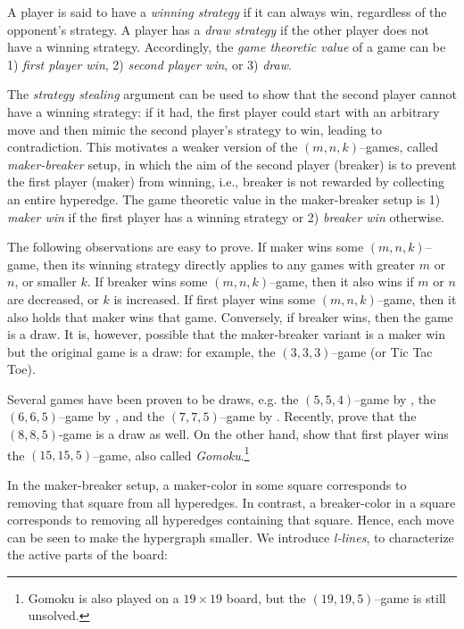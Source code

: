 \documentclass[conference]{IEEEtran}
\theoremstyle{definition}
\begin{document}
A player is said to have a \emph{winning strategy} if it can always win, regardless of the opponent's strategy. A player has a \emph{draw strategy} if the other player does not have a winning strategy. Accordingly, the \emph{game theoretic value} of a game can be 1) \emph{first player win}, 2) \emph{second player win}, or 3) \emph{draw}.

The \emph{strategy stealing} argument can be used to show that the second player cannot have a winning strategy: if it had, the first player could start with an arbitrary move and then mimic the second player's strategy to win, leading to contradiction. This motivates a weaker version of the $(m, n, k)$--games,
called \emph{maker-breaker} setup, in which the aim of the second player (breaker) is to prevent the first player (maker) from winning, i.e., breaker is not rewarded by collecting an entire hyperedge. The game theoretic value in the maker-breaker setup is 1) \emph{maker win} if the first player has a winning strategy or 2) \emph{breaker win} otherwise.

The following observations are easy to prove. If maker wins some $(m,n,k)$--game, then its winning strategy directly applies to any games with greater $m$ or $n$, or smaller $k$. If breaker wins some $(m,n,k)$--game, then it also wins if $m$ or $n$ are decreased, or $k$ is increased. 
If first player wins some $(m,n,k)$--game, then it also holds that maker wins that game. Conversely, if breaker wins, then the game is a draw. It is, however, possible that the maker-breaker variant is a maker win but the original game is a draw: for example, the $(3,3,3)$--game (or Tic Tac Toe).

Several games have been proven to be draws, e.g. the $(5,5,4)$--game by \cite{BerlekampElwynR1983Wwfy}, the $(6,6,5)$--game by \cite{UITERWIJK200043}, and the $(7,7,5)$--game by \cite{gomoku775}. Recently, \cite{HSU202079} prove that the $(8,8,5)$-game is a draw as well. On the other hand, \cite{Allis1994SearchingFS} show that first player wins the $(15,15,5)$--game, also called \emph{Gomoku}.\footnote{Gomoku is also played on a $19 \times 19$ board, but the $(19, 19, 5)$--game is still unsolved.}

In the maker-breaker setup, a maker-color in some square corresponds to removing that square from all hyperedges. In contrast, a breaker-color in a square corresponds to removing all hyperedges containing that square. Hence, each move can be seen to make the hypergraph smaller. We introduce \emph{l-lines}, to characterize the active parts of the board:
\end{document}
